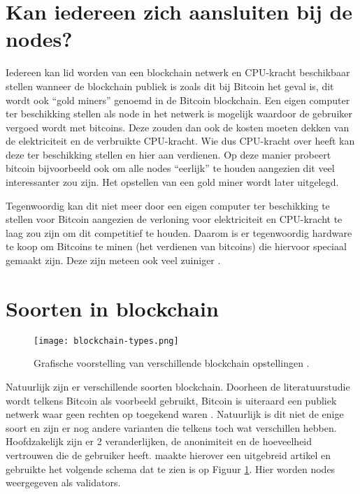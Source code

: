 \section{Kan iedereen zich aansluiten bij de nodes?}
Iedereen kan lid worden van een blockchain netwerk en CPU-kracht beschikbaar stellen wanneer de blockchain publiek is zoals dit bij Bitcoin het geval is, dit wordt ook ``gold miners'' genoemd in de Bitcoin blockchain. Een eigen computer ter beschikking stellen als node in het netwerk is mogelijk waardoor de gebruiker vergoed wordt met bitcoins. Deze zouden dan ook de kosten moeten dekken van de elektriciteit en de verbruikte CPU-kracht. Wie dus CPU-kracht over heeft kan deze ter beschikking stellen en hier aan verdienen. Op deze manier probeert  bitcoin bijvoorbeeld ook om alle nodes ``eerlijk'' te houden aangezien dit veel interessanter zou zijn. Het opstellen van een gold miner wordt later uitgelegd. 

Tegenwoordig kan dit niet meer door een eigen computer ter beschikking te stellen voor Bitcoin aangezien de verloning voor elektriciteit en CPU-kracht te laag zou zijn om dit competitief te houden. Daarom is er tegenwoordig hardware te koop om Bitcoins te minen (het verdienen van bitcoins) die hiervoor speciaal gemaakt zijn. Deze zijn meteen ook veel zuiniger \textcite{Bitcoinmining.com}.

\section{Soorten in blockchain}

\begin{figure}
	\texttt{[image: blockchain-types.png]}
	\caption{Grafische voorstelling van verschillende blockchain opstellingen \textcite{Kravchenko2016}.}
	\label{fig:blockchain-types}
\end{figure}

Natuurlijk zijn er verschillende soorten blockchain. Doorheen de literatuurstudie wordt telkens Bitcoin als voorbeeld gebruikt, Bitcoin is uiteraard een publiek netwerk waar geen rechten op toegekend waren \textcite{Nakamoto2008}. Natuurlijk is dit niet de enige soort en zijn er nog andere varianten die telkens toch wat verschillen hebben. Hoofdzakelijk zijn er 2 veranderlijken, de anonimiteit en de hoeveelheid vertrouwen die de gebruiker heeft. \textcite{Kravchenko2016} maakte hierover een uitgebreid artikel en gebruikte het volgende schema dat te zien is op Figuur \ref{fig:blockchain-types}. Hier worden nodes weergegeven als validators.

